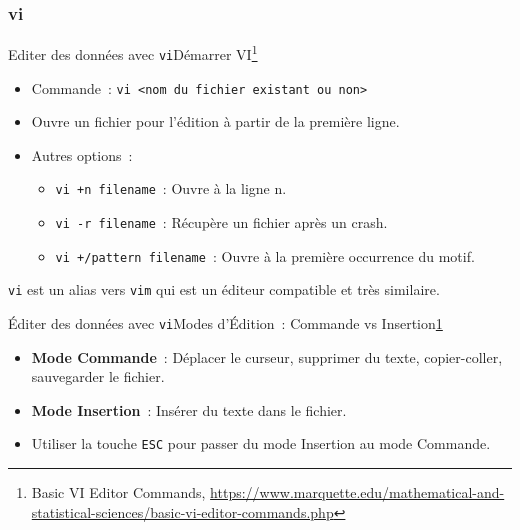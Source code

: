 \documentclass{beamer}
\begin{document}
    \subsubsection{vi}\label{subsubsec:vi}
    \begin{frame}{Editer des données avec \lstinline{vi}}{Démarrer VI\footnote{\label{marquette-vi}Basic VI Editor Commands, \url{https://www.marquette.edu/mathematical-and-statistical-sciences/basic-vi-editor-commands.php}}}
        \begin{itemize}
            \item Commande~: \lstinline{vi <nom du fichier existant ou non>}
            \item Ouvre un fichier pour l'édition à partir de la première ligne.
            \item Autres options~:
            \begin{itemize}
                \item \lstinline{vi +n filename}~: Ouvre à la ligne n.
                \item \lstinline{vi -r filename}~: Récupère un fichier après un crash.
                \item \lstinline{vi +/pattern filename}~: Ouvre à la première occurrence du motif.
            \end{itemize}
        \end{itemize}
        \begin{dangercolorbox}
            \lstinline{vi} est un alias vers \lstinline{vim} qui est un éditeur compatible et très similaire.
        \end{dangercolorbox}
    \end{frame}

    \begin{frame}{Éditer des données avec \lstinline{vi}}{Modes d'Édition~: Commande vs Insertion\cref{marquette-vi}}
        \begin{itemize}
            \item \textbf{Mode Commande}~: Déplacer le curseur, supprimer du texte, copier-coller, sauvegarder le fichier.
            \item \textbf{Mode Insertion}~: Insérer du texte dans le fichier.
            \item Utiliser la touche \lstinline{ESC} pour passer du mode Insertion au mode Commande.
        \end{itemize}
    \end{frame}
\end{document}
